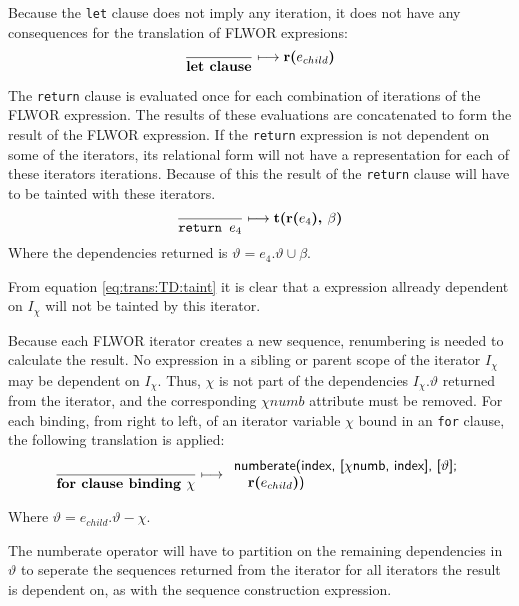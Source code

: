 Because the \texttt{let} clause does not imply any iteration, it does not have any consequences for the
translation of FLWOR expresions:
\begin{equation}
\frac{}{\mbox{\textbf{let clause}}}\longmapsto \mbox{\textbf{r(}}e_{child}\mbox{\textbf{)}}
\label{rule:trans:TD:letclause}
\end{equation}

The \texttt{return} clause is evaluated once for each combination of iterations of the FLWOR expression. The
results of these evaluations are concatenated to form the result of the FLWOR expression. If the \texttt{return}
expression is not dependent on some of the iterators, its relational form will not have a representation for each
of these iterators iterations. Because of this the result of the \texttt{return} clause will have to be tainted
with these iterators.
\begin{equation}
\frac{}{\mbox{\texttt{return }}e_{4}}\longmapsto
\mbox{\textbf{t(r(}}e_{4}\mbox{\textbf{), }}\beta\mbox{\textbf{)}}
\label{rule:trans:TD:returnTaint}
\end{equation}
Where the dependencies returned is $\vartheta = e_4.\vartheta \cup \beta$.

From equation \ref{eq:trans:TD:taint} it is clear that a expression allready dependent on $I_{\chi}$ will not be
tainted by this iterator.

Because each FLWOR iterator creates a new sequence, renumbering is needed to calculate the result. No expression in
a sibling or parent scope of the iterator $I_{\chi}$ may be dependent on $I_{\chi}$. Thus, $\chi$ is not part of the
dependencies $I_{\chi}.\vartheta$ returned from the iterator, and the corresponding $\chi{numb}$ attribute must be
removed. For each binding, from right to left, of an iterator variable $\chi$ bound in an \texttt{for} clause,
the following translation is applied: 
\begin{equation}
\frac{}{\mbox{\textbf{for clause binding }}\chi}
\longmapsto
\begin{array}{l}
\mbox{\textsf{numberate(index, [}}\chi\mbox{\textsf{numb, index], [}}\vartheta\mbox{\textsf{];}} \\ \quad
\mbox{\textbf{r(}}e_{child}\mbox{\textbf{)}\textsf{)}}
\end{array}
\label{rule:trans:TD:forReturn}
\end{equation}

Where $\vartheta = e_{child}.\vartheta - \chi$.

The \textsf{numberate} operator will have to partition on the remaining dependencies in $\vartheta$ to seperate
the sequences returned from the iterator for all iterators the result is dependent on, as with the sequence
construction expression.

